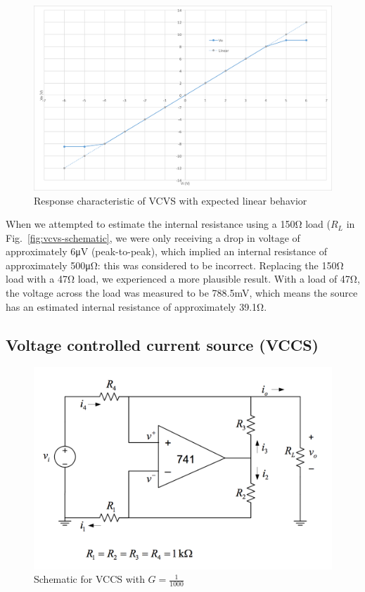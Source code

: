 \begin{figure}
	\centering
	\includegraphics[width=0.7\linewidth]{graphics/vcvs-graph}
	\caption{Response characteristic of VCVS with expected linear behavior}
	\label{fig:vcvs-graph}
\end{figure}

When we attempted to estimate the internal resistance using a 150\si{\ohm} load ($R_L$ in Fig.~\ref{fig:vcvs-schematic}, we were only receiving a drop in voltage of approximately 6\si{\micro\volt} (peak-to-peak), which implied an internal resistance of approximately 500\si{\micro\ohm}: this was considered to be incorrect. Replacing the 150\si{\ohm} load with a 47\si{\ohm} load, we experienced a more plausible result. With a load of 47\si{\ohm}, the voltage across the load was measured to be 788.5\si{\milli\volt}, which means the source has an estimated internal resistance of approximately 39.1\si{\ohm}.


\subsection{Voltage controlled current source (VCCS)}\label{sec:vccs}
\begin{figure}[tbph]
	\centering
	\includegraphics[width=0.7\linewidth]{graphics/vccs-schematic}
	\caption{Schematic for VCCS with $G = \frac{1}{1000}$}
	\label{fig:vccs-schematic}
\end{figure}

